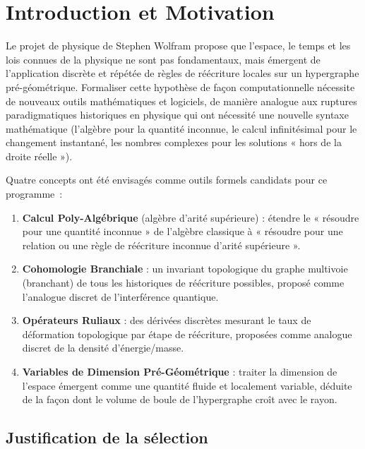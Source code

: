 \documentclass[11pt,a4paper]{article}
\begin{document}
\tableofcontents

\section{Introduction et Motivation}

Le projet de physique de Stephen Wolfram propose que l'espace, le temps et
les lois connues de la physique ne sont pas fondamentaux, mais émergent de
l'application discrète et répétée de règles de réécriture locales sur un
hypergraphe pré-géométrique. Formaliser cette hypothèse de façon
computationnelle nécessite de nouveaux outils mathématiques et logiciels,
de manière analogue aux ruptures paradigmatiques historiques en physique
qui ont nécessité une nouvelle syntaxe mathématique (l'algèbre pour la
quantité inconnue, le calcul infinitésimal pour le changement instantané,
les nombres complexes pour les solutions « hors de la droite réelle »).

Quatre concepts ont été envisagés comme outils formels candidats pour ce
programme~:

\begin{enumerate}
\item \textbf{Calcul Poly-Algébrique} (algèbre d'arité supérieure) :
  étendre le « résoudre pour une quantité inconnue » de l'algèbre classique
  à « résoudre pour une relation ou une règle de réécriture inconnue
  d'arité supérieure ».
\item \textbf{Cohomologie Branchiale} : un invariant topologique du graphe
  multivoie (branchant) de tous les historiques de réécriture possibles,
  proposé comme l'analogue discret de l'interférence quantique.
\item \textbf{Opérateurs Ruliaux} : des dérivées discrètes mesurant le taux
  de déformation topologique par étape de réécriture, proposées comme
  analogue discret de la densité d'énergie/masse.
\item \textbf{Variables de Dimension Pré-Géométrique} : traiter la
  dimension de l'espace émergent comme une quantité fluide et localement
  variable, déduite de la façon dont le volume de boule de l'hypergraphe
  croît avec le rayon.
\end{enumerate}

\subsection{Justification de la sélection}
\end{document}
